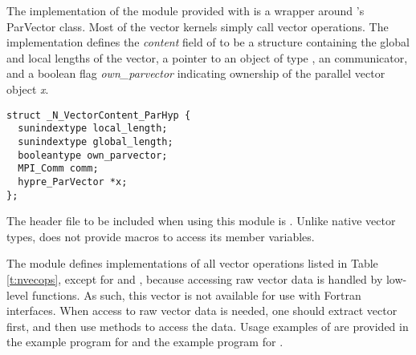 %
The {\nvecph} implementation of the {\nvector} module provided with
{\sundials} is a wrapper around {\hypre}'s ParVector class. 
Most of the vector kernels simply call {\hypre} vector operations. 
The implementation defines the {\em content} field of  to 
be a structure containing the global and local lengths of the vector, a 
pointer to an object of type , an {\mpi} communicator, 
and a boolean flag {\em own\_parvector} indicating ownership of the
{\hypre} parallel vector object {\em x}.
\begin{verbatim}
struct _N_VectorContent_ParHyp {
  sunindextype local_length;
  sunindextype global_length;
  booleantype own_parvector;
  MPI_Comm comm;
  hypre_ParVector *x;
};
\end{verbatim}
The header file to be included when using this module is .
Unlike native {\sundials} vector types, {\nvecph} does not provide macros 
to access its member variables.

The {\nvecph} module defines implementations of all vector operations 
listed in Table \ref{t:nvecops}, except for  and 
, because accessing raw vector data is handled by 
low-level {\hypre} functions. 
As such, this vector is not available for use with {\sundials} Fortran interfaces.
When access to raw vector data is needed, one 
should extract {\hypre} vector first, and then use {\hypre} 
methods to access the data. Usage examples of {\nvecph} are provided in 
the  example program for {\cvode} \cite{cvode_ex} 
and the  example program for {\arkode} \cite{arkode_ex}.

